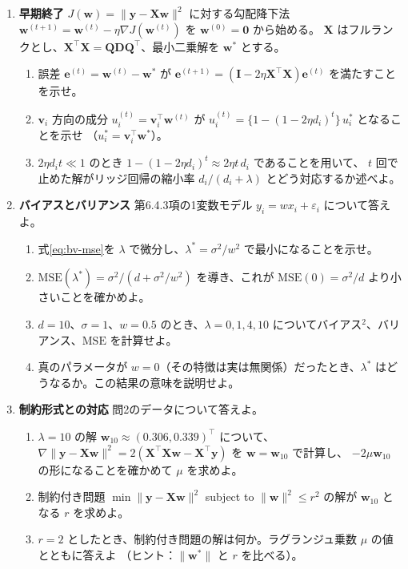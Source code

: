 \begin{enumerate}
  \item \textbf{早期終了}\quad
    $J(\bm{w}) = \|\bm{y} - \bm{X}\bm{w}\|^2$ に対する勾配降下法 $\bm{w}^{(t+1)} = \bm{w}^{(t)} - \eta\nabla J(\bm{w}^{(t)})$ を $\bm{w}^{(0)} = \bm{0}$ から始める。
    $\bm{X}$ はフルランクとし、$\bm{X}^\top\bm{X} = \bm{Q}\bm{D}\bm{Q}^\top$、最小二乗解を $\bm{w}^*$ とする。
    \begin{enumerate}
      \item 誤差 $\bm{e}^{(t)} = \bm{w}^{(t)} - \bm{w}^*$ が $\bm{e}^{(t+1)} = (\bm{I} - 2\eta\bm{X}^\top\bm{X})\bm{e}^{(t)}$ を満たすことを示せ。
      \item $\bm{v}_i$ 方向の成分 $u_i^{(t)} = \bm{v}_i^\top\bm{w}^{(t)}$ が $u_i^{(t)} = \{1 - (1 - 2\eta d_i)^t\}\,u_i^*$ となることを示せ
        （$u_i^* = \bm{v}_i^\top\bm{w}^*$）。
      \item $2\eta d_i t \ll 1$ のとき $1 - (1 - 2\eta d_i)^t \approx 2\eta t\,d_i$ であることを用いて、
        $t$ 回で止めた解がリッジ回帰の縮小率 $d_i/(d_i + \lambda)$ とどう対応するか述べよ。
    \end{enumerate}

  \item \textbf{バイアスとバリアンス}\quad
    第6.4.3項の1変数モデル $y_i = w x_i + \varepsilon_i$ について答えよ。
    \begin{enumerate}
      \item 式\eqref{eq:bv-mse}を $\lambda$ で微分し、$\lambda^* = \sigma^2/w^2$ で最小になることを示せ。
      \item $\mathrm{MSE}(\lambda^*) = \sigma^2/(d + \sigma^2/w^2)$ を導き、これが $\mathrm{MSE}(0) = \sigma^2/d$ より小さいことを確かめよ。
      \item $d = 10$、$\sigma = 1$、$w = 0.5$ のとき、$\lambda = 0, 1, 4, 10$ についてバイアス$^2$、バリアンス、$\mathrm{MSE}$ を計算せよ。
      \item 真のパラメータが $w = 0$（その特徴は実は無関係）だったとき、$\lambda^*$ はどうなるか。この結果の意味を説明せよ。
    \end{enumerate}

  \item \textbf{制約形式との対応}\quad
    問2のデータについて答えよ。
    \begin{enumerate}
      \item $\lambda = 10$ の解 $\bm{w}_{10} \approx (0.306, 0.339)^\top$ について、$\nabla\|\bm{y} - \bm{X}\bm{w}\|^2 = 2(\bm{X}^\top\bm{X}\bm{w} - \bm{X}^\top\bm{y})$ を $\bm{w} = \bm{w}_{10}$ で計算し、
        $-2\mu\bm{w}_{10}$ の形になることを確かめて $\mu$ を求めよ。
      \item 制約付き問題 $\min \|\bm{y} - \bm{X}\bm{w}\|^2$ subject to $\|\bm{w}\|^2 \leq r^2$ の解が $\bm{w}_{10}$ となる $r$ を求めよ。
      \item $r = 2$ としたとき、制約付き問題の解は何か。ラグランジュ乗数 $\mu$ の値とともに答えよ
        （ヒント：$\|\bm{w}^*\|$ と $r$ を比べる）。
    \end{enumerate}


\end{enumerate}

